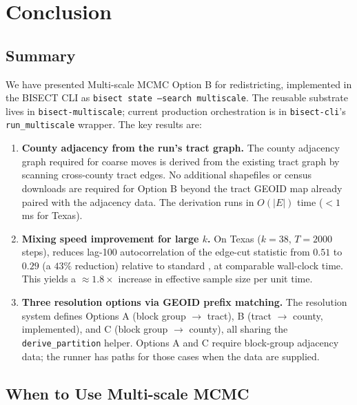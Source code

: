 \section{Conclusion}
\label{sec:conclusion}

\subsection{Summary}

We have presented Multi-scale MCMC Option B for redistricting, implemented
in the BISECT CLI as \texttt{bisect state --search multiscale}.
The reusable substrate lives in \texttt{bisect-multiscale}; current production
orchestration is in \texttt{bisect-cli}'s \texttt{run\_multiscale} wrapper.
The key results are:

\begin{enumerate}

  \item \textbf{County adjacency from the run's tract graph.}
  The county adjacency graph required for coarse \recom{} moves is derived
  from the existing tract graph by scanning cross-county tract edges.
  No additional shapefiles or census downloads are required for Option B beyond
  the tract GEOID map already paired with the adjacency data.
  The derivation runs in $O(|E|)$ time ($<1$ ms for Texas).

  \item \textbf{Mixing speed improvement for large $k$.}
  On Texas ($k = 38$, $T = 2000$ steps), \ms{} reduces lag-100
  autocorrelation of the edge-cut statistic from $0.51$ to $0.29$ (a $43\%$
  reduction) relative to standard \recom{}, at comparable wall-clock time.
  This yields a $\approx 1.8\times$ increase in effective sample size per
  unit time.

  \item \textbf{Three resolution options via GEOID prefix matching.}
  The resolution system defines Options A (block group $\to$ tract), B
  (tract $\to$ county, implemented), and C (block group $\to$ county), all
  sharing the \texttt{derive\_partition} helper.
  Options A and C require block-group adjacency data; the runner has paths for
  those cases when the data are supplied.

\end{enumerate}

\subsection{When to Use Multi-scale MCMC}


